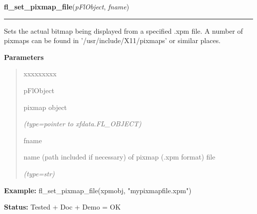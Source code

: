     \label{xformslib:flbitmap:fl_set_pixmap_file}

    \vspace{0.5ex}

\hspace{.8\funcindent}\begin{boxedminipage}{\funcwidth}

    \raggedright \textbf{fl\_set\_pixmap\_file}(\textit{pFlObject}, \textit{fname})

    \vspace{-1.5ex}

    \rule{\textwidth}{0.5\fboxrule}
\setlength{\parskip}{2ex}
    Sets the actual bitmap being displayed from a specified .xpm file. A 
    number of pixmaps can be found in '/usr/include/X11/pixmaps' or similar
    places.

\setlength{\parskip}{1ex}
      \textbf{Parameters}
      \vspace{-1ex}

      \begin{quote}
        \begin{Ventry}{xxxxxxxxx}

          \item[pFlObject]

          pixmap object

            {\it (type=pointer to xfdata.FL\_OBJECT)}

          \item[fname]

          name (path included if necessary) of pixmap (.xpm format) file

            {\it (type=str)}

        \end{Ventry}

      \end{quote}

\textbf{Example:} fl\_set\_pixmap\_file(xpmobj, "mypixmapfile.xpm")



\textbf{Status:} Tested + Doc + Demo = OK



    \end{boxedminipage}

    \label{xformslib:flbitmap:fl_set_pixmap_file}

